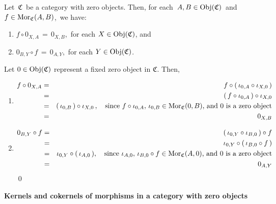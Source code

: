 
\vskip 0.5cm
\begin{lemma}
\mbox{}
\vskip 0.15cm
\noindent
Let \,$\mathfrak{C}$\, be a category with zero objects.
Then, for each \,$A, B \in \textnormal{Obj}(\mathfrak{C})$\, and \,$f \in \textnormal{Mor}_{\mathfrak{C}}(A,B)$,\, we have:
\begin{enumerate}
\item
	$f \circ 0_{X,A} \,=\, 0_{X,B}$,\, for each $X \in \textnormal{Obj}(\mathfrak{C})$, and
\item
	$0_{B,Y} \circ f \,=\, 0_{A,Y}$,\, for each $Y \in \textnormal{Obj}(\mathfrak{C})$.
\end{enumerate}
\end{lemma}
\proof
Let $0 \in \textnormal{Obj}(\mathfrak{C})$ represent a fixed zero object in $\mathfrak{C}$.
Then,
\begin{enumerate}
\item
	\begin{eqnarray*}
	f \circ 0_{X,A}
	& = &
		f \circ (\,\iota_{0,A} \circ \iota_{X,0}\,)
	\\
	& = &
		(\,f \circ \iota_{0,A}\,) \circ \iota_{X,0}
	\\
	& = &
		(\,\iota_{0,B}\,) \circ \iota_{X,0}\,,
		\quad
		\textnormal{since $f \circ \iota_{0,A},\, \iota_{0,B} \in \textnormal{Mor}_{\mathfrak{C}}(0,B)$, and $0$ is a zero object}
	\\
	& = &
		0_{X,B}
	\end{eqnarray*}
\item
	\begin{eqnarray*}
	0_{B,Y} \circ f
	& = &
		(\,\iota_{0,Y} \circ \iota_{B,0}\,) \circ f
	\\
	& = &
		\iota_{0,Y} \circ (\,\iota_{B,0} \circ f\,)
	\\
	& = &
		\iota_{0,Y} \circ (\,\iota_{A,0}\,),
		\quad
		\textnormal{since $\iota_{A,0},\, \iota_{B,0} \circ f \in \textnormal{Mor}_{\mathfrak{C}}(A,0)$, and $0$ is a zero object}
	\\
	& = &
		0_{A,Y}
	\end{eqnarray*}
	\vskip -0.5cm
	\qed
\end{enumerate}


\vskip 1.0cm
\noindent
\textbf{\large Kernels and cokernels of morphisms in a category with zero objects}


